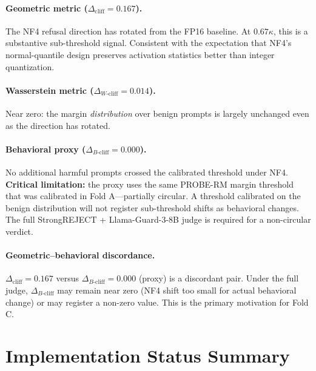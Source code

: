 \documentclass[11pt,a4paper]{article}
\newcommand{\cliff}{\Delta_{\mathrm{cliff}}}
\newcommand{\wcliff}{\Delta_{W\text{-cliff}}}
\newcommand{\bcliff}{\Delta_{B\text{-cliff}}}
\newcommand{\kap}{\kappa}
\begin{document}
\paragraph{Geometric metric ($\cliff = 0.167$).}
The NF4 refusal direction has rotated from the FP16 baseline.
At $0.67\kap$, this is a substantive sub-threshold signal.
Consistent with the expectation that NF4's normal-quantile design
preserves activation statistics better than integer quantization.

\paragraph{Wasserstein metric ($\wcliff = 0.014$).}
Near zero: the margin \emph{distribution} over benign prompts is largely unchanged
even as the direction has rotated.

\paragraph{Behavioral proxy ($\bcliff = 0.000$).}
No additional harmful prompts crossed the calibrated threshold under NF4.
\textbf{Critical limitation:} the proxy uses the same PROBE-RM margin threshold that
was calibrated in Fold A---partially circular.
A threshold calibrated on the benign distribution will not register sub-threshold
shifts as behavioral changes.
The full StrongREJECT + Llama-Guard-3-8B judge is required for a non-circular verdict.

\paragraph{Geometric--behavioral discordance.}
$\cliff = 0.167$ versus $\bcliff = 0.000$ (proxy) is a discordant pair.
Under the full judge, $\bcliff$ may remain near zero (NF4 shift too small for
actual behavioral change) or may register a non-zero value.
This is the primary motivation for Fold C.

\section{Implementation Status Summary}
\label{sec:status}
\end{document}
